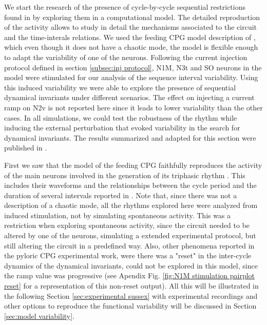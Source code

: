 We start the research of the presence of cycle-by-cycle sequential restrictions found in \textcite{elices_robust_2019} by exploring them in a computational model. The detailed reproduction of the activity allows to study in detail the mechanisms associated to the circuit and the time-interals relations. We used the feeding CPG model description of \textcite{vavoulis_dynamic_2007}, which even though it does not have a chaotic mode, the model is flexible enough to adapt the variability of one of the neurons. Following the current injection protocol defined in section \ref{subsec:inj protocol}, N1M, N3t and SO neurons in the model were stimulated for our analysis of the sequence interval variability. Using this induced variability we were able to explore the presence of sequential dynamical invariants under different scenarios. The effect on injecting a current ramp on N2v is not reported here since it leads to lower variability than the other cases. In all simulations, we could test the robustness of the rhythm while inducing the external perturbation that evoked variability in the search for dynamical invariants. The results summarized and adapted for this section were published in \cite{garrido-pena_characterization_2021}.

First we saw that the model of the feeding CPG faithfully reproduces the activity of the main neurons involved in the generation of its triphasic rhythm \parencite{vavoulis_dynamic_2007}. This includes their waveforms and the relationships between the cycle period and the duration of several intervals reported in \parencite{elliott_temporal_1991}. Note that, since there was not a description of a chaotic mode, all the rhythms explored here were analyzed from induced stimulation, not by simulating spontaneous activity. This was a restriction when exploring spontaneous activity, since the circuit needed to be altered by one of the neurons, simulating a extended experimental protocol, but still altering the circuit in a predefined way. Also, other phenomena reported in the pyloric CPG experimental work, were there was a "reset" in the inter-cycle dynamics of the dynamical invariants, could not be explored in this model, since the ramp value was progressive (see Apendix Fig. \ref{fig:N1M stimulation pairplot reset} for a representation of this non-reset output). All this will be illustrated in the following Section \ref{sec:experimental sussex} with experimental recordings and other options to reproduce the functional variability will be discussed in Section \ref{sec:model variability}.

